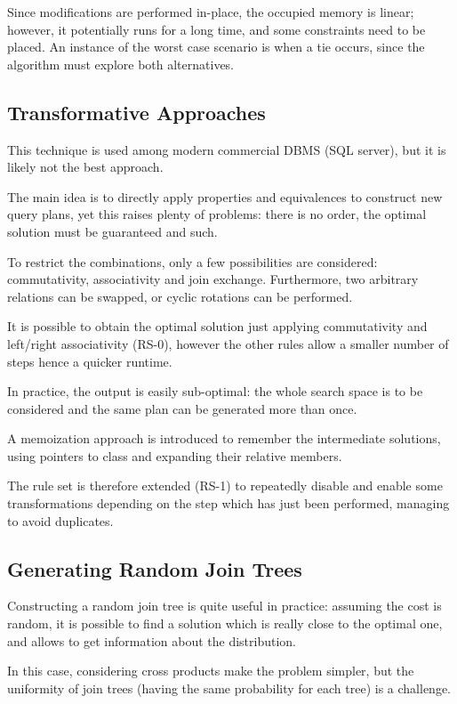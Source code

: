 Since modifications are performed in-place, the occupied memory is linear; however, it potentially runs for a long time, and some constraints need to be placed. An instance of the worst case scenario is when a tie occurs, since the algorithm must explore both alternatives. 

\subsection{Transformative Approaches}
This technique is used among modern commercial DBMS (SQL server), but it is likely not the best approach. 

The main idea is to directly apply properties and equivalences to construct new query plans, yet this raises plenty of problems: there is no order, the optimal solution must be guaranteed and such. 

To restrict the combinations, only a few possibilities are considered: commutativity, associativity and join exchange. Furthermore, two arbitrary relations can be swapped, or cyclic rotations can be performed. 

It is possible to obtain the optimal solution just applying commutativity and left/right associativity (RS-0), however the other rules allow a smaller number of steps hence a quicker runtime.

In practice, the output is easily sub-optimal: the whole search space is to be considered and the same plan can be generated more than once. 

A memoization approach is introduced to remember the intermediate solutions, using pointers to class and expanding their relative members.

The rule set is therefore extended (RS-1) to repeatedly disable and enable some transformations depending on the step which has just been performed, managing to avoid duplicates. 

\subsection{Generating Random Join Trees}
Constructing a random join tree is quite useful in practice: assuming the cost is random, it is possible to find a solution which is really close to the optimal one, and allows to get information about the distribution.

In this case, considering cross products make the problem simpler, but the uniformity of join trees (having the same probability for each tree) is a challenge.

